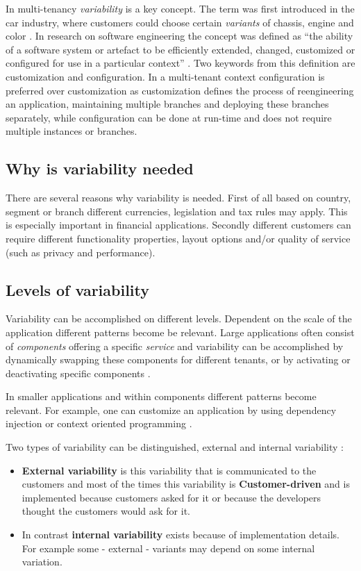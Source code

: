 In multi-tenancy \textit{variability} is a key concept. The term was first introduced in the car industry, where customers could choose certain \textit{variants} of chassis, engine and color \cite[p. 153]{kabbedijk2011variability}. 
In research on software engineering the concept was defined as ``the ability of a software system or artefact to be efficiently extended, changed, customized or configured for use in a particular context'' \cite{svahnberg2005taxonomy}.
Two keywords from this definition are customization and configuration. In a multi-tenant context configuration is preferred over customization \cite{sun2008software} as customization defines the process of reengineering an application, maintaining multiple branches and deploying these branches separately, while configuration can be done at run-time and does not require multiple instances or branches.

\subsection{Why is variability needed}
There are several reasons why variability is needed. 
First of all based on country, segment or branch different currencies, legislation and tax rules may apply. This is especially important in financial applications. 
Secondly different customers can require different functionality properties, layout options and/or quality of service (such as privacy and performance).

\subsection{Levels of variability}
Variability can be accomplished on different levels. 
Dependent on the scale of the application different patterns become be relevant. Large applications often consist of \textit{components} offering a specific \textit{service} and variability can be accomplished by dynamically swapping these components for different tenants, or by activating or deactivating specific components \cite{mietzner2008defining}. 

In smaller applications and within components different patterns become relevant. For example, one can customize an application by using dependency injection \cite{walraven2011middleware} or context oriented programming \cite{truyen2012context}.

Two types of variability can be distinguished, external and internal variability \cite{mietzner2009variability}:
 \begin{itemize}
\item \textbf{External variability} is this variability that is communicated to the customers and most of the times this variability is \textbf{Customer-driven} and is implemented because customers asked for it or because the developers thought the customers would ask for it. 
\item In contrast  \textbf{internal variability} exists because of implementation details. For example some - external - variants may depend on some internal variation.
\end{itemize}

